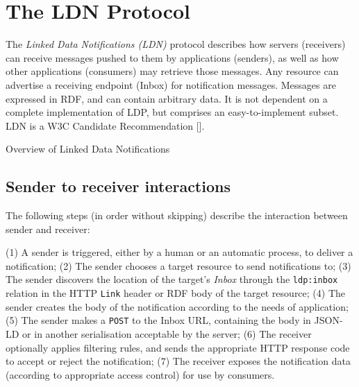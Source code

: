                     
                        \section{The LDN Protocol}
  \label{protocol}

                        
                            
\par The {\em Linked Data Notifications (LDN)} protocol describes how servers (receivers) can receive messages pushed to them by applications (senders), as well as how other applications (consumers) may retrieve those messages. Any resource can advertise a receiving endpoint (Inbox) for notification messages. Messages are expressed in RDF, and can contain arbitrary data. It is not dependent on a complete implementation of LDP, but comprises an easy-to-implement subset. LDN is a \empty W3C Candidate Recommendation [].

                            
                                

                                Overview of Linked Data Notifications
                            

                            
                                \subsection{Sender to receiver interactions}
  \label{sender-to-receiver}

                                
                                    
\par The following steps (in order without skipping) describe the interaction between sender and receiver:

                                    
\par (1) A sender is triggered, either by a human or an automatic process, to deliver a notification; (2) The sender chooses a target resource to send notifications to; (3) The sender discovers the location of the target’s {\em Inbox} through the {\tt ldp:inbox} relation in the HTTP {\tt Link} header or RDF body of the target resource; (4) The sender creates the body of the notification according to the needs of application; (5) The sender makes a {\tt POST} to the Inbox URL, containing the body in JSON-LD or in another serialisation acceptable by the server; (6) The receiver optionally applies filtering rules, and sends the appropriate HTTP response code to accept or reject the notification; (7) The receiver exposes the notification data (according to appropriate access control) for use by consumers.
                                
